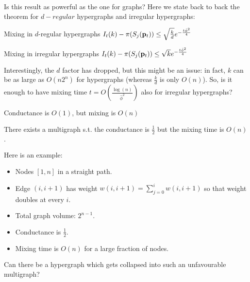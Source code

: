 \documentclass[../main.tex]{subfiles}
\begin{document}
    \begin{frame}{Is this result as powerful as the one for graphs?} 
		Here we state back to back the theorem for $d-regular$ hypergraphs and irregular hypergraphs:
		\begin{block}{Mixing in $d$-regular hypergraphs}
			$I_t(k) - \pi(S_j(\bold{p}_{t})) \leq \sqrt{\frac{k}{d}} e^{-\frac{t\hat{\phi}^2}{4}}$
		\end{block}
		\begin{block}{Mixing in irregular hypergraphs}
			$I_t(k) - \pi(S_j(\bold{p}_{t})) \leq \sqrt{k} e^{-\frac{t\hat{\phi}^2}{4}}$
		\end{block}
	
		Interestingly, the $d$ factor has dropped, but this might be an issue: in fact, $k$ can be as large as $O(n2^n)$ for hypergraphs (whereas $\frac{k}{d}$ is only $O(n)$). So, is it enough to have mixing time $t=O\left(\frac{\log(n)}{\hat{\phi}^2}\right)$ also for irregular hypergraphs?
    \end{frame}

	\begin{frame}{Conductance is $O(1)$, but mixing is $O(n)$}
		\begin{lemma}
			There exists a multigraph s.t. the conductance is $\frac{1}{2}$ but the mixing time is $O(n)$.
		\end{lemma}
		Here is an example: 
		\begin{itemize}
			\item Nodes $[1,n]$ in a straight path.
			\item Edge $(i,i+1)$ has weight $w(i,i+1) = \sum_{j=0}^{i} w(i,i+1)$ so that weight doubles at every $i$.
			\item Total graph volume: $2^{n-1}$.
			\item Conductance is $\frac{1}{2}$.
			\item Mixing time is $O(n)$ for a large fraction of nodes.
		\end{itemize}
		Can there be a hypergraph which gets collapsed into such an unfavourable multigraph?
	\end{frame}
\end{document}
